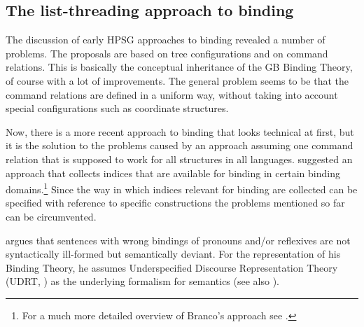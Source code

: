 \documentclass[output=paper
 	        ,biblatex
                ,babelshorthands
                ,newtxmath
                ,draftmode
                ,colorlinks, citecolor=brown
]{langscibook}
\begin{document}
\subsection{The list-threading approach to binding}


The discussion of early HPSG approaches to binding revealed a number of problems. The proposals are
based on tree configurations and on command relations. This is basically the conceptual inheritance
of the GB Binding Theory, of course with a lot of improvements. The general problem seems to be that
the command relations are defined in a uniform way, without taking into account special configurations such as coordinate structures.

Now, there is a more recent approach to binding that looks technical at first, but it is the
solution to the problems caused by an approach assuming one command relation that is supposed
to work for all structures in all languages. \citet{Branco2002a} suggested an approach that collects
indices that are available for binding in certain binding domains.\footnote{%
For a much more detailed overview of Branco's approach see .
} Since the way in which indices
relevant for binding are collected can be specified with reference to specific constructions the
problems mentioned so far can be circumvented. 

\citet{Branco2002a} argues that sentences with wrong bindings of pronouns and/or reflexives are not
syntactically ill-formed but semantically deviant. For the representation of his Binding Theory, he
assumes Underspecified Discourse Representation Theory (UDRT, \citealp{Reyle93b-u,FR95a-u}) as the
underlying formalism for semantics (see also
). 
\end{document}
